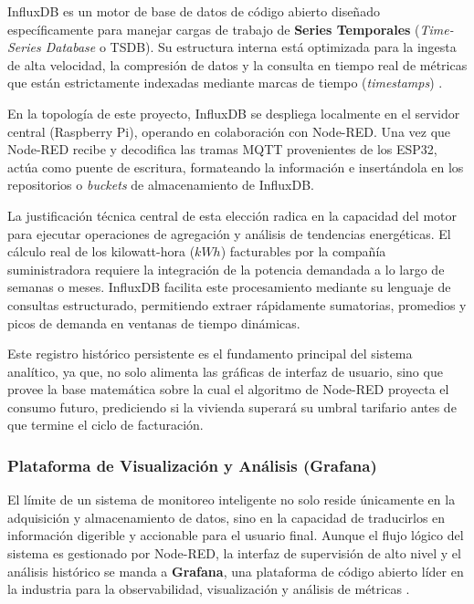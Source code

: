             InfluxDB es un motor de base de datos de código abierto diseñado específicamente para manejar cargas de trabajo de \textbf{Series Temporales} (\textit{Time-Series Database} o TSDB). Su estructura interna está optimizada para la ingesta de alta velocidad, la compresión de datos y la consulta en tiempo real de métricas que están estrictamente indexadas mediante marcas de tiempo (\textit{timestamps}) \cite{influxdata2026doc}. 

            En la topología de este proyecto, InfluxDB se despliega localmente en el servidor central (Raspberry Pi), operando en colaboración con Node-RED. Una vez que Node-RED recibe y decodifica las tramas MQTT provenientes de los ESP32, actúa como puente de escritura, formateando la información e insertándola en los repositorios o \textit{buckets} de almacenamiento de InfluxDB.

            La justificación técnica central de esta elección radica en la capacidad del motor para ejecutar operaciones de agregación y análisis de tendencias energéticas. El cálculo real de los kilowatt-hora ($kWh$) facturables por la compañía suministradora requiere la integración de la potencia demandada a lo largo de semanas o meses. InfluxDB facilita este procesamiento mediante su lenguaje de consultas estructurado, permitiendo extraer rápidamente sumatorias, promedios y picos de demanda en ventanas de tiempo dinámicas.

            Este registro histórico persistente es el fundamento principal del sistema analítico, ya que, no solo alimenta las gráficas de interfaz de usuario, sino que provee la base matemática sobre la cual el algoritmo de Node-RED proyecta el consumo futuro, prediciendo si la vivienda superará su umbral tarifario antes de que termine el ciclo de facturación.

        \subsubsection{Plataforma de Visualización y Análisis (Grafana)}

            El límite de un sistema de monitoreo inteligente no solo reside únicamente en la adquisición y almacenamiento de datos, sino en la capacidad de traducirlos en información digerible y accionable para el usuario final. Aunque el flujo lógico del sistema es gestionado por Node-RED, la interfaz de supervisión de alto nivel y el análisis histórico se manda a \textbf{Grafana}, una plataforma de código abierto líder en la industria para la observabilidad, visualización y análisis de métricas \cite{grafanalabs2026doc}.

